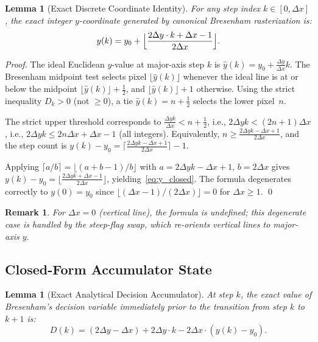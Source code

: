 \documentclass[12pt,a4paper]{article}
\newtheorem{lemma}[theorem]{Lemma}
\newtheorem*{remark}{Remark}
\theoremstyle{definition}
\newcommand{\dx}{\Delta x}
\newcommand{\dy}{\Delta y}
\begin{document}
\begin{lemma}[Exact Discrete Coordinate Identity]
\label{lem:pixel_coord}
For any step index $k \in [0, \dx]$, the exact integer
$y$-coordinate generated by canonical Bresenham rasterization
is:
\begin{equation}
  \label{eq:y_closed}
  y(k) = y_0 + \Bigl\lfloor \frac{2\dy \cdot k + \dx - 1}{2\dx} \Bigr\rfloor.
\end{equation}
\end{lemma}

\begin{proof}
The ideal Euclidean $y$-value at major-axis step $k$ is
$\hat{y}(k) = y_0 + \frac{\dy}{\dx}k$. The Bresenham
midpoint test selects pixel $\lfloor\hat{y}(k)\rfloor$
whenever the ideal line is at or below the midpoint
$\lfloor\hat{y}(k)\rfloor + \tfrac{1}{2}$, and
$\lfloor\hat{y}(k)\rfloor + 1$ otherwise. Using the strict
inequality $D_k > 0$ (not $\ge 0$), a tie
$\hat{y}(k) = n + \tfrac{1}{2}$ selects the lower pixel~$n$.

The strict upper threshold corresponds to
$\frac{\dy k}{\dx} < n + \tfrac{1}{2}$, i.e.,
$2\dy k < (2n+1)\dx$, i.e., $2\dy k \le 2n\dx + \dx - 1$
(all integers). Equivalently,
$n \ge \frac{2\dy k - \dx + 1}{2\dx}$, and the step count
is $y(k) - y_0 = \bigl\lceil\frac{2\dy k - \dx + 1}{2\dx}\bigr\rceil - 1$.

Applying $\lceil a/b\rceil = \lfloor(a+b-1)/b\rfloor$
with $a = 2\dy k - \dx + 1$, $b = 2\dx$ gives
$y(k) - y_0 = \lfloor\frac{2\dy k + \dx - 1}{2\dx}\rfloor$,
yielding~\eqref{eq:y_closed}. The formula degenerates
correctly to $y(0) = y_0$ since
$\lfloor(\dx - 1)/(2\dx)\rfloor = 0$ for $\dx \ge 1$.
\qed
\end{proof}

\begin{remark}
For $\dx = 0$ (vertical line), the formula is undefined;
this degenerate case is handled by the steep-flag swap,
which re-orients vertical lines to major-axis $y$.
\end{remark}

\subsection{Closed-Form Accumulator State}

\begin{lemma}[Exact Analytical Decision Accumulator]
\label{lem:error_state}
At step $k$, the exact value of Bresenham's decision variable
immediately prior to the transition from step $k$ to $k+1$ is:
\begin{equation}
  \label{eq:D_closed}
  D(k) = (2\dy - \dx) + 2\dy \cdot k - 2\dx \cdot (y(k) - y_0).
\end{equation}
\end{lemma}
\end{document}
